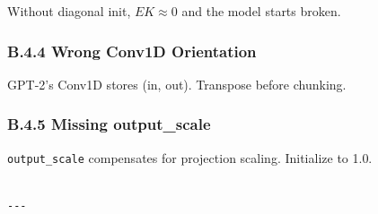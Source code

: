 Without diagonal init, $E K \approx 0$ and the model starts broken.

\subsubsection{B.4.4 Wrong Conv1D Orientation}

GPT-2's Conv1D stores (in, out). Transpose before chunking.

\subsubsection{B.4.5 Missing output\_scale}

\texttt{output\_scale} compensates for projection scaling. Initialize to 1.0.
\begin{lstlisting}

---
\end{lstlisting}